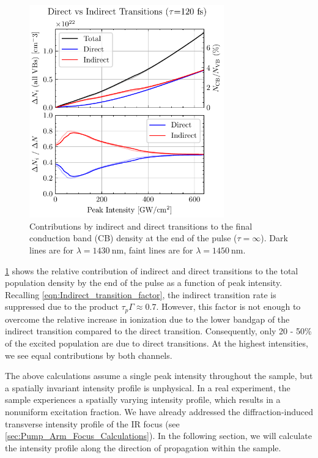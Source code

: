 \begin{figure}
	\centering
	\includegraphics[width=0.75\textwidth]{figures/chap4/Direct_vs_Indirect_Trans.pdf}
	\caption{Contributions by indirect and direct transitions to the final conduction band (CB) density at the end of the pulse ($\tau = \infty$). Dark lines are for $\lambda = 1430 \ \textrm{nm}$, faint lines are for $\lambda = 1450 \ \textrm{nm}$.}
	\label{fig:Direct_vs_Indirect_Trans}
\end{figure}

\cref{fig:Direct_vs_Indirect_Trans} shows the relative contribution of indirect and direct transitions to the total population density by the end of the pulse as a function of peak intensity. Recalling \cref{eqn:Indirect_transition_factor}, the indirect transition rate is suppressed due to the product $\tau_p \Gamma \approx 0.7$. However, this factor is not enough to overcome the relative increase in ionization due to the lower bandgap of the indirect transition compared to the direct transition. Consequently, only {20 - 50\%} of the excited population are due to direct transitions. At the highest intensities, we see equal contributions by both channels.

The above calculations assume a single peak intensity throughout the sample, but a spatially invariant intensity profile is unphysical. In a real experiment, the sample experiences a spatially varying intensity profile, which results in a nonuniform excitation fraction. We have already addressed the diffraction-induced transverse intensity profile of the IR focus (see \cref{sec:Pump_Arm_Focus_Calculations}). In the following section, we will calculate the intensity profile along the direction of propagation within the sample.

